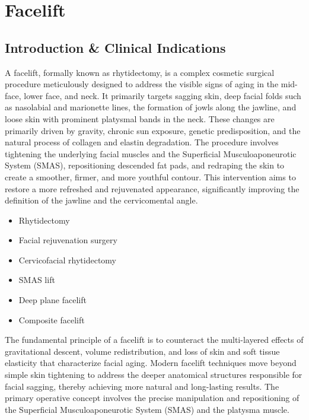 \chapter{Facelift}

\section*{Introduction \& Clinical Indications}
A facelift, formally known as rhytidectomy, is a complex cosmetic surgical procedure meticulously designed to address the visible signs of aging in the mid-face, lower face, and neck. It primarily targets sagging skin, deep facial folds such as nasolabial and marionette lines, the formation of jowls along the jawline, and loose skin with prominent platysmal bands in the neck. These changes are primarily driven by gravity, chronic sun exposure, genetic predisposition, and the natural process of collagen and elastin degradation. The procedure involves tightening the underlying facial muscles and the Superficial Musculoaponeurotic System (SMAS), repositioning descended fat pads, and redraping the skin to create a smoother, firmer, and more youthful contour. This intervention aims to restore a more refreshed and rejuvenated appearance, significantly improving the definition of the jawline and the cervicomental angle.

\begin{itemize}
  \item Rhytidectomy
  \item Facial rejuvenation surgery
  \item Cervicofacial rhytidectomy
  \item SMAS lift
  \item Deep plane facelift
  \item Composite facelift
\end{itemize}

The fundamental principle of a facelift is to counteract the multi-layered effects of gravitational descent, volume redistribution, and loss of skin and soft tissue elasticity that characterize facial aging. Modern facelift techniques move beyond simple skin tightening to address the deeper anatomical structures responsible for facial sagging, thereby achieving more natural and long-lasting results. The primary operative concept involves the precise manipulation and repositioning of the Superficial Musculoaponeurotic System (SMAS) and the platysma muscle.

